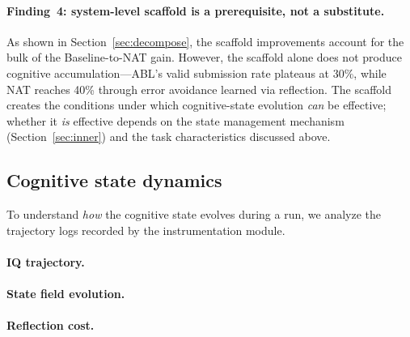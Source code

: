 \documentclass{article} %
\begin{document}
\paragraph{Finding~4: system-level scaffold is a prerequisite, not a
substitute.}
As shown in Section~\ref{sec:decompose}, the scaffold improvements account
for the bulk of the Baseline-to-NAT gain. However, the scaffold alone does
not produce cognitive accumulation---ABL's valid submission rate plateaus at
30\%, while NAT reaches 40\% through error avoidance learned via reflection.
The scaffold creates the conditions under which cognitive-state evolution
\emph{can} be effective; whether it \emph{is} effective depends on the state
management mechanism (Section~\ref{sec:inner}) and the task characteristics
discussed above.


\subsection{Cognitive state dynamics}
\label{sec:dynamics}

To understand \emph{how} the cognitive state evolves during a run, we analyze
the trajectory logs recorded by the instrumentation module.

\paragraph{IQ trajectory.}

\paragraph{State field evolution.}

\paragraph{Reflection cost.}
\end{document}

